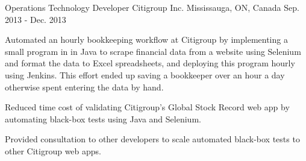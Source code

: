 

\begin{cventries}

  \cventry
    {Operations Technology Developer} %
    {Citigroup Inc.} %
    {Mississauga, ON, Canada} %
    {Sep. 2013 - Dec. 2013} %
    {
      \begin{cvitems} %
        \item {
          Automated an hourly bookkeeping workflow at Citigroup by implementing a small program in
          in Java to scrape financial data from a website using Selenium and format the data to
          Excel spreadsheets, and deploying this program hourly using Jenkins. This effort ended
          up saving a bookkeeper over an hour a day otherwise spent entering the data by hand.
        }
        \item {
          Reduced time cost of validating Citigroup's Global Stock Record web app by automating
          black-box tests using Java and Selenium.
        }
        \item {
          Provided consultation to other developers to scale automated black-box tests to
          other Citigroup web apps.
        }
      \end{cvitems}
    }


\end{cventries}
